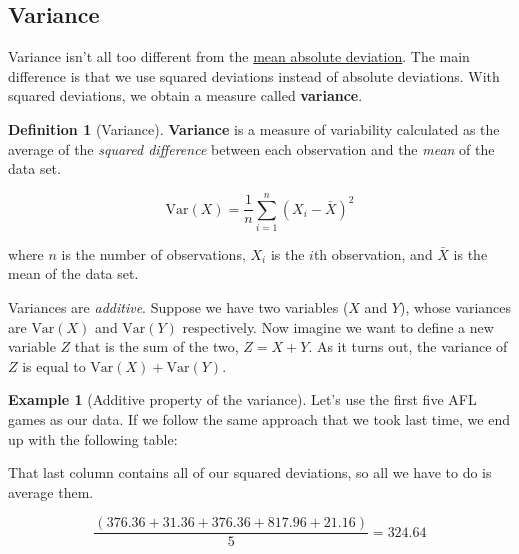 \documentclass[
  11pt,
]{book}
\theoremstyle{definition}
\newtheorem{definition}{Definition}[chapter]
\theoremstyle{definition}
\newtheorem{example}{Example}[chapter]
\theoremstyle{definition}
\theoremstyle{definition}
\theoremstyle{remark}
\begin{document}
\hypertarget{variance}{%
\subsection{Variance}\label{variance}}

Variance isn't all too different from the \protect\hyperlink{aad}{mean absolute deviation}. The main difference is that we use squared deviations instead of absolute deviations. With squared deviations, we obtain a measure called \textbf{variance}.

\begin{definition}[Variance]
\protect\hypertarget{def:defVar}{}\label{def:defVar}\textbf{Variance} is a measure of variability calculated as the average of the \emph{squared difference} between each observation and the \emph{mean} of the data set.

\[
\mbox{Var}(X) = \frac{1}{n} \sum_{i=1}^n (X_i - \bar{X})^2
\]

where \(n\) is the number of observations, \(X_i\) is the \(i\)th observation, and \(\bar{X}\) is the mean of the data set.
\end{definition}

Variances are \emph{additive}. Suppose we have two variables (\(X\) and \(Y\)), whose variances are \(\mbox{Var}(X)\) and \(\mbox{Var}(Y)\) respectively. Now imagine we want to define a new variable \(Z\) that is the sum of the two, \(Z = X+Y\). As it turns out, the variance of \(Z\) is equal to \(\mbox{Var}(X) + \mbox{Var}(Y)\).

\begin{example}[Additive property of the variance]
\protect\hypertarget{exm:exVarAddit}{}\label{exm:exVarAddit}Let's use the first five AFL games as our data. If we follow the same approach that we took last time, we end up with the following table:

\begin{table}[H]
\centering
{}
\end{table}

That last column contains all of our squared deviations, so all we have to do is average them.

\[
\frac{( 376.36 + 31.36 + 376.36 + 817.96 + 21.16 )}{5} = 324.64
\]
\end{example}
\end{document}
